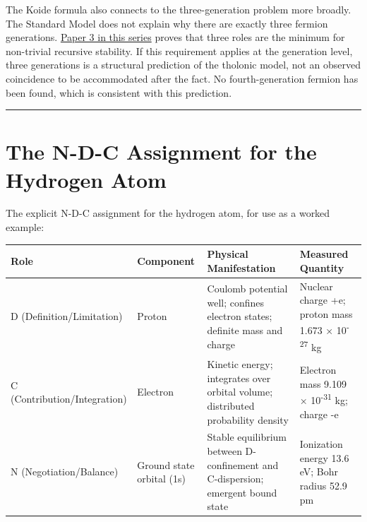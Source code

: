 \documentclass[12pt]{article}
\begin{document}
The Koide formula also connects to the three-generation problem more
broadly. The Standard Model does not explain why there are exactly three
fermion generations.
\href{https://github.com/baardev/truevalue/blob/main/docnav/Research/papers/3_minimal-recursive-triadic-framework/3_minimal-recursive-triadic-framework.pdf}{Paper
3 in this series} proves that three roles are the minimum for
non-trivial recursive stability. If this requirement applies at the
generation level, three generations is a structural prediction of the
tholonic model, not an observed coincidence to be accommodated after the
fact. No fourth-generation fermion has been found, which is consistent
with this prediction.

\begin{center}\rule{0.5\linewidth}{0.5pt}\end{center}

\section{The N-D-C Assignment for the Hydrogen Atom}\label{the-n-d-c-assignment-for-the-hydrogen-atom}

The explicit N-D-C assignment for the hydrogen atom, for use as a worked
example:

\begin{longtable}[]{@{}
  >{\raggedright\arraybackslash}p{}
  >{\raggedright\arraybackslash}p{}
  >{\raggedright\arraybackslash}p{}
  >{\raggedright\arraybackslash}p{}@{}}
\toprule\noalign{}
\begin{minipage}[b]{\linewidth}\raggedright
Role
\end{minipage} & \begin{minipage}[b]{\linewidth}\raggedright
Component
\end{minipage} & \begin{minipage}[b]{\linewidth}\raggedright
Physical Manifestation
\end{minipage} & \begin{minipage}[b]{\linewidth}\raggedright
Measured Quantity
\end{minipage} \\
\midrule\noalign{}
\endhead
\bottomrule\noalign{}
\endlastfoot
D (Definition/Limitation) & Proton & Coulomb potential well; confines
electron states; definite mass and charge & Nuclear charge +e; proton
mass 1.673 × 10\textsuperscript{-27} kg \\
C (Contribution/Integration) & Electron & Kinetic energy; integrates
over orbital volume; distributed probability density & Electron mass
9.109 × 10\textsuperscript{-31} kg; charge -e \\
N (Negotiation/Balance) & Ground state orbital (1s) & Stable equilibrium
between D-confinement and C-dispersion; emergent bound state &
Ionization energy 13.6 eV; Bohr radius 52.9 pm \\
\end{longtable}
\end{document}
